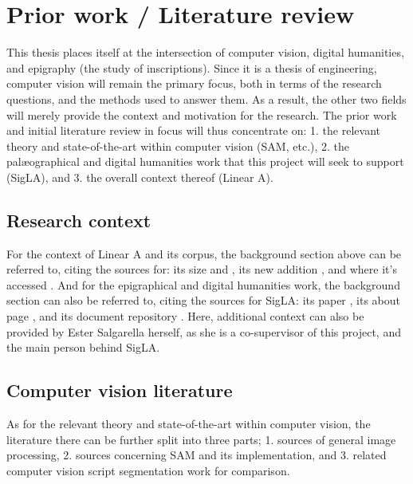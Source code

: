 \section{Prior work / Literature review}

\noindent

This thesis places itself at the intersection of computer vision, digital humanities, and epigraphy (the study of inscriptions).
Since it is a thesis of engineering, computer vision will remain the primary focus, both in terms of the research questions, and the methods used to answer them.
As a result, the other two fields will merely provide the context and motivation for the research.
The prior work and initial literature review in focus will thus concentrate on: 1. the relevant theory and state-of-the-art within computer vision (\acs{SAM}, etc.),
2. the palæographical and digital humanities work that this project will seek to support (SigLA),
and 3. the overall context thereof (Linear A).

\subsection{Research context}

For the context of Linear A and its corpus, the background section above can be referred to, citing the sources for: its size \parencite{Salgarella2020} and \parencite{Salgarella2025}, its new addition \parencite{RILA-S1}, and where it's accessed \parencite{EtudesCretoises21}.
And for the epigraphical and digital humanities work, the background section can also be referred to, citing the sources for SigLA: its paper \parencite{SalgarellaCastellanSigLA2020}, its about page \parencite{SigLAAboutPage}, and its document repository \parencite{SigLASearchDocuments}.
Here, additional context can also be provided by Ester Salgarella herself, as she is a co-supervisor of this project, and the main person behind SigLA.

\subsection{Computer vision literature}

As for the relevant theory and state-of-the-art within computer vision, the literature there can be further split into three parts;
1. sources of general image processing,
2. sources concerning SAM and its implementation,
and 3. related computer vision script segmentation work for comparison.

